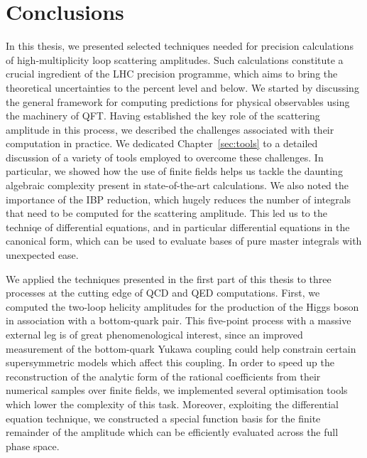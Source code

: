 \documentclass[main.tex]{subfiles}
\begin{document}
\chapter{Conclusions} \label{sec:conclusions}
In this thesis, we presented selected techniques needed for precision calculations of high-multiplicity loop scattering amplitudes. Such calculations constitute a crucial ingredient of the LHC precision programme, which aims to bring the theoretical uncertainties to the percent level and below. We started by discussing the general framework for computing predictions for physical observables using the machinery of QFT. Having established the key role of the scattering amplitude in this process, we described the challenges associated with their computation in practice. We dedicated Chapter~\ref{sec:tools} to a detailed discussion of a variety of tools employed to overcome these challenges. In particular, we showed how the use of finite fields helps us tackle the daunting algebraic complexity present in state-of-the-art calculations. We also noted the importance of the IBP reduction, which hugely reduces the number of integrals that need to be computed for the scattering amplitude. This led us to the techniqe of differential equations, and in particular differential equations in the canonical form, which can be used to evaluate bases of pure master integrals with unexpected ease.

We applied the techniques presented in the first part of this thesis to three processes at the cutting edge of QCD and QED computations. First, we computed the two-loop helicity amplitudes for the production of the Higgs boson in association with a bottom-quark pair. This five-point process with a massive external leg is of great phenomenological interest, since an improved measurement of the bottom-quark Yukawa coupling could help constrain certain supersymmetric models which affect this coupling. In order to speed up the reconstruction of the analytic form of the rational coefficients from their numerical samples over finite fields, we implemented several optimisation tools which lower the complexity of this task. Moreover, exploiting the differential equation technique, we constructed a special function basis for the finite remainder of the amplitude which can be efficiently evaluated across the full phase space.
\end{document}
